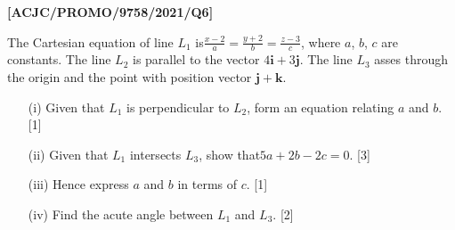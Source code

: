 \item \textbf{{[}ACJC/PROMO/9758/2021/Q6{]}}

The Cartesian equation of line $L_{1}$ is$\frac{x-2}{a}=\frac{y+2}{b}=\frac{z-3}{c}$,
where $a$, $b$, $c$ are constants. The line $L_{2}$ is parallel
to the vector $4\mathbf{i}+3\mathbf{j}$. The line $L_{3}$ asses
through the origin and the point with position vector $\mathbf{j}+\mathbf{k}$. 
\begin{enumerate}
\item[(i)]  Given that $L_{1}$ is perpendicular to $L_{2}$, form an equation
relating $a$ and $b$. \hfill{}{[}1{]}
\item[(ii)]  Given that $L_{1}$ intersects $L_{3}$, show that$5a+2b-2c=0$.
\hfill{}{[}3{]}
\item[(iii)]  Hence express $a$ and $b$ in terms of $c$. \hfill{}{[}1{]}
\item[(iv)]  Find the acute angle between $L_{1}$ and $L_{3}$. \hfill{}{[}2{]}
\end{enumerate}